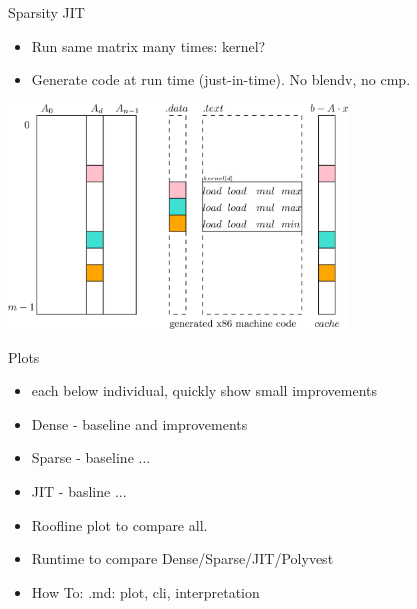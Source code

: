 \documentclass[table]{beamer}
\begin{document}
\begin{frame}[t]{Sparsity JIT}
	\begin{itemize}
	    \item Run same matrix many times: kernel?
	    \item Generate code at run time (just-in-time). No blendv, no cmp.
	\end{itemize}
	\begin{center}
	    \includegraphics[width=90mm]{sparsity/jit.eps}
	\end{center}
\end{frame}


\begin{frame}{Plots}
	\begin{itemize}
	    \item each below individual, quickly show small improvements
		\item Dense - baseline and improvements
	    \item Sparse - baseline ...
	    \item JIT - basline ...
	    \item Roofline plot to compare all.
	    \item Runtime to compare Dense/Sparse/JIT/Polyvest
	    \item How To: .md: plot, cli, interpretation
	\end{itemize}
\end{frame}
\end{document}
